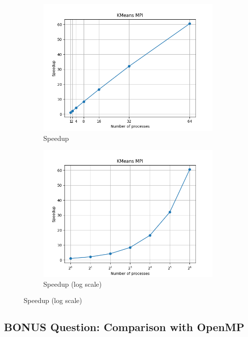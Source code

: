 \documentclass{article}
\newcommand{\eng}[1]{#1}
\begin{document}
\begin{figure}[h]
\begin{subfigure}{0.45\textwidth}
        \includegraphics[width=\textwidth]{a5/plots/kmeans_mpi_speedup.png}
        \caption{\eng{Speedup}}
    \end{subfigure}
    \begin{subfigure}{0.45\textwidth}
        \includegraphics[width=\textwidth]{a5/plots/kmeans_mpi_speedup_log.png}
        \caption{\eng{Speedup} (log scale)}
        \label{fig:kmeans-mpi-speedup}
    \end{subfigure}
\end{figure}
\FloatBarrier

\subsection{\eng{BONUS} Question: Comparison with \eng{OpenMP}}
\end{document}
